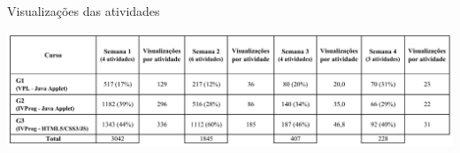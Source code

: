 \begin{table}[h]
\caption{Visualizações das atividades}
\includegraphics[width=1.0\textwidth]{pdfs/table_visualizacoes.pdf} 
\label{tab:ivprog}
\end{table}


